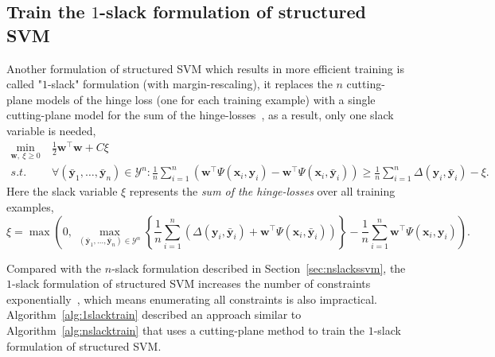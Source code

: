 \documentclass[9pt]{extarticle}
\begin{document}
\subsection{Train the $1$-slack formulation of structured SVM}
\label{sec:1slackssvm}

Another formulation of structured SVM which results in more efficient training is called "$1$-slack" formulation (with margin-rescaling),
it replaces the $n$ cutting-plane models of the hinge loss (one for each training example) with a single cutting-plane model for 
the sum of the hinge-losses~\cite{joachims2009cutting}, as a result, only one slack variable is needed,
\begin{equation}
\label{eq:1slackform}
\begin{aligned}
\min_{\mathbf{w}, ~\xi \ge 0} ~& \frac{1}{2} \mathbf{w}^\top \mathbf{w} + C \xi \\
s.t.~~ ~& \forall(\bar{\mathbf{y}}_1, \dots, \bar{\mathbf{y}}_n) \in \mathcal{Y}^n: 
          \frac{1}{n} \sum_{i=1}^n 
          \left( \mathbf{w}^\top \Psi(\mathbf{x}_i, \mathbf{y}_i) - \mathbf{w}^\top \Psi(\mathbf{x}_i, \bar{\mathbf{y}}_i) \right) \ge
          \frac{1}{n} \sum_{i=1}^n \Delta(\mathbf{y}_i, \bar{\mathbf{y}}_i) - \xi.
\end{aligned}
\end{equation}
Here the slack variable $\xi$ represents the \emph{sum of the hinge-losses} over all training examples,
\begin{equation}
\label{eq:1slackloss}
\xi = \max \left( 0,~ 
      \max_{(\bar{\mathbf{y}}_1, \dots, \bar{\mathbf{y}}_n) \in \mathcal{Y}^n} 
      \left\{ 
      \frac{1}{n} \sum_{i=1}^n \left( \Delta(\mathbf{y}_i, \bar{\mathbf{y}}_i) + \mathbf{w}^\top \Psi(\mathbf{x}_i, \bar{\mathbf{y}}_i) \right)
      \right\} - \frac{1}{n} \sum_{i=1}^n \mathbf{w}^\top \Psi(\mathbf{x}_i, \mathbf{y}_i)
      \right).
\end{equation}


Compared with the $n$-slack formulation described in Section~\ref{sec:nslackssvm}, 
the $1$-slack formulation of structured SVM increases the number of constraints exponentially~\cite{joachims2009cutting},
which means enumerating all constraints is also impractical.
Algorithm~\ref{alg:1slacktrain} described an approach similar to Algorithm~\ref{alg:nslacktrain} that uses a cutting-plane method to 
train the $1$-slack formulation of structured SVM.
\end{document}
